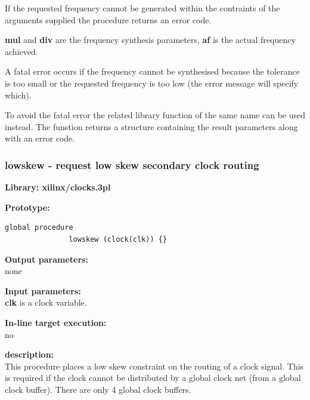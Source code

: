             If the requested frequency cannot be generated within the
            contraints of the arguments supplied the procedure returns
            an error code.
            
            {\bf mul} and {\bf div} are the frequency synthesis parameters,
            {\bf af} is the actual frequency achieved.
            
            A fatal error occurs if the frequency cannot be synthesised because the tolerance is too
            small or the requested frequency is too low (the error message will specify which).
            
            To avoid the fatal error the related library function of the same name can be used
            instead. The funstion returns a structure containing the result parameters along
            with an error code.
            
            

        \subsubsection{lowskew - request low skew secondary clock routing}\label{sec:lplowskew}
            
            {\bf Library: xilinx/clocks.3pl}

            {\bf Prototype:} \\
            \vsp
            \begin{lstlisting}[gobble=12, language=threepl]
               global procedure
               lowskew (clock(clk)) {}
            \end{lstlisting}

            {\bf Output parameters:} \\
            none

            {\bf Input parameters:} \\            
            {\bf clk} is a clock variable.
        
            {\bf In-line target execution:} \\
            no

            {\bf description:} \\
            This procedure places a low skew constraint on the routing
            of a clock signal. This is required if the clock cannot be
            distributed by a global clock net (from a global clock buffer).
            There are only 4 global clock buffers.





